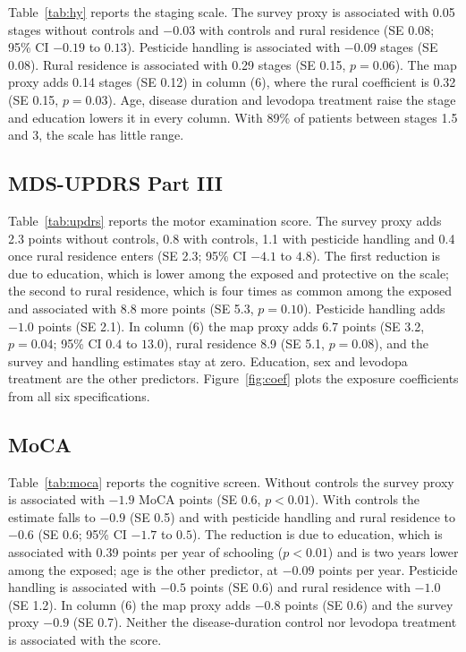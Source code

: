 \documentclass[11pt,a4paper]{article}
\begin{document}
Table~\ref{tab:hy} reports the staging scale. The survey proxy is associated with 0.05 stages without controls and $-0.03$ with controls and rural residence (SE 0.08; 95\% CI $-0.19$ to $0.13$). Pesticide handling is associated with $-0.09$ stages (SE 0.08). Rural residence is associated with 0.29 stages (SE 0.15, $p=0.06$). The map proxy adds 0.14 stages (SE 0.12) in column (6), where the rural coefficient is 0.32 (SE 0.15, $p=0.03$). Age, disease duration and levodopa treatment raise the stage and education lowers it in every column. With 89\% of patients between stages 1.5 and 3, the scale has little range.

\begin{table}[H]\centering\scriptsize
\caption{Crop proximity and pesticide handling on Hoehn \& Yahr stage: OLS}\label{tab:hy}

\end{table}

\subsection{MDS-UPDRS Part III}

Table~\ref{tab:updrs} reports the motor examination score. The survey proxy adds 2.3 points without controls, 0.8 with controls, 1.1 with pesticide handling and 0.4 once rural residence enters (SE 2.3; 95\% CI $-4.1$ to $4.8$). The first reduction is due to education, which is lower among the exposed and protective on the scale; the second to rural residence, which is four times as common among the exposed and associated with 8.8 more points (SE 5.3, $p=0.10$). Pesticide handling adds $-1.0$ points (SE 2.1). In column (6) the map proxy adds 6.7 points (SE 3.2, $p=0.04$; 95\% CI $0.4$ to $13.0$), rural residence 8.9 (SE 5.1, $p=0.08$), and the survey and handling estimates stay at zero. Education, sex and levodopa treatment are the other predictors. Figure~\ref{fig:coef} plots the exposure coefficients from all six specifications.

\begin{table}[H]\centering\scriptsize
\caption{Crop proximity and pesticide handling on MDS-UPDRS Part III: OLS}\label{tab:updrs}

\end{table}

\subsection{MoCA}

Table~\ref{tab:moca} reports the cognitive screen. Without controls the survey proxy is associated with $-1.9$ MoCA points (SE 0.6, $p<0.01$). With controls the estimate falls to $-0.9$ (SE 0.5) and with pesticide handling and rural residence to $-0.6$ (SE 0.6; 95\% CI $-1.7$ to $0.5$). The reduction is due to education, which is associated with 0.39 points per year of schooling ($p<0.01$) and is two years lower among the exposed; age is the other predictor, at $-0.09$ points per year. Pesticide handling is associated with $-0.5$ points (SE 0.6) and rural residence with $-1.0$ (SE 1.2). In column (6) the map proxy adds $-0.8$ points (SE 0.6) and the survey proxy $-0.9$ (SE 0.7). Neither the disease-duration control nor levodopa treatment is associated with the score.
\end{document}
